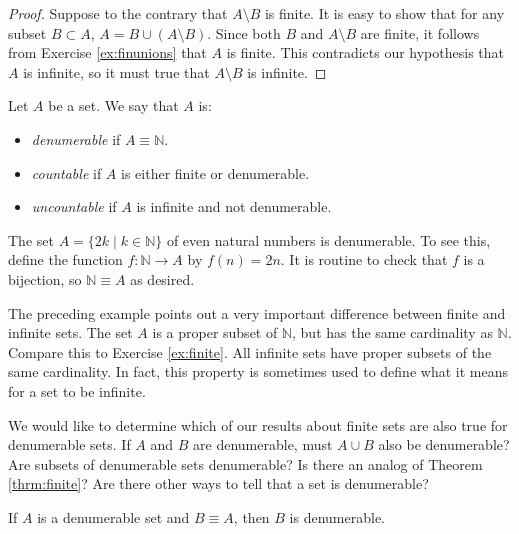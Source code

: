 \begin{proof}
Suppose to the contrary that $A\setminus B$ is finite.  It is easy to show that for any subset $B\subset A$, $A=B\cup(A\setminus B)$.  Since both $B$ and $A\setminus B$ are finite, it follows from Exercise \ref{ex:finunions} that $A$ is finite.  This contradicts our hypothesis that $A$ is infinite, so it must true that $A\setminus B$ is infinite.
\end{proof}

\begin{definition}
Let $A$ be a set. We say that $A$ is:
\begin{itemize}
\item \emph{denumerable} if $A\equiv\mathbb N$.  
\item \emph{countable} if $A$ is either finite or denumerable. 
\item \emph{uncountable} if $A$ is infinite and not denumerable.
\end{itemize}
\end{definition}

\begin{example}
The set $A=\{2k\mid k\in\mathbb N\}$ of even natural numbers is denumerable.  To see this, define the function $f:\mathbb N\to A$ by $f(n)=2n$. It is routine to check that $f$ is a bijection, so $\mathbb N\equiv A$ as desired.
\end{example}

The preceding example points out a very important difference between finite and infinite sets.  The set $A$ is a proper subset of $\mathbb N$, but has the same cardinality as $\mathbb N$.  Compare this to Exercise \ref{ex:finite}.  All infinite sets have proper subsets of the same cardinality.  In fact, this property is sometimes used to define what it means for a set to be infinite.

We would like to determine which of our results about finite sets are also true for denumerable sets.  If $A$ and $B$ are denumerable, must $A\cup B$ also be denumerable?  Are subsets of denumerable sets denumerable?  Is there an analog of Theorem \ref{thrm:finite}?  Are there other ways to tell that a set is denumerable?

\begin{thrm}\label{thrm:denumtrans}
If $A$ is a denumerable set and $B\equiv A$, then $B$ is denumerable.
\end{thrm}

